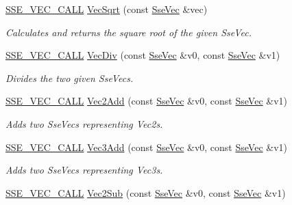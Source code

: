 \begin{DoxyCompactItemize}
\hyperlink{ssevec__math__defs_8h_a97454f977a5281455cecacce1e8ba670}{S\+S\+E\+\_\+\+V\+E\+C\+\_\+\+C\+A\+L\+L} \hyperlink{group___s_i_m_d_vec_math_ga5a870dbad6fdb8496b2e95104cc15f12}{Vec\+Sqrt} (const \hyperlink{namespacegofxmath_a634570ddcd2496053ee966227080e02f}{Sse\+Vec} \&vec)
\begin{DoxyCompactList}\small\item\em Calculates and returns the square root of the given Sse\+Vec. \end{DoxyCompactList}\item 
\hyperlink{ssevec__math__defs_8h_a97454f977a5281455cecacce1e8ba670}{S\+S\+E\+\_\+\+V\+E\+C\+\_\+\+C\+A\+L\+L} \hyperlink{group___s_i_m_d_vec_math_ga1aa6bb34526133e71f288a8e1e100fb1}{Vec\+Div} (const \hyperlink{namespacegofxmath_a634570ddcd2496053ee966227080e02f}{Sse\+Vec} \&v0, const \hyperlink{namespacegofxmath_a634570ddcd2496053ee966227080e02f}{Sse\+Vec} \&v1)
\begin{DoxyCompactList}\small\item\em Divides the two given Sse\+Vecs. \end{DoxyCompactList}\item 
\hyperlink{ssevec__math__defs_8h_a97454f977a5281455cecacce1e8ba670}{S\+S\+E\+\_\+\+V\+E\+C\+\_\+\+C\+A\+L\+L} \hyperlink{group___s_i_m_d_vec_math_gad1bc5d9e13ba5c54e2bf457ef9c0a30b}{Vec2\+Add} (const \hyperlink{namespacegofxmath_a634570ddcd2496053ee966227080e02f}{Sse\+Vec} \&v0, const \hyperlink{namespacegofxmath_a634570ddcd2496053ee966227080e02f}{Sse\+Vec} \&v1)
\begin{DoxyCompactList}\small\item\em Adds two Sse\+Vecs representing Vec2s. \end{DoxyCompactList}\item 
\hyperlink{ssevec__math__defs_8h_a97454f977a5281455cecacce1e8ba670}{S\+S\+E\+\_\+\+V\+E\+C\+\_\+\+C\+A\+L\+L} \hyperlink{group___s_i_m_d_vec_math_ga8a939dc9ef27240f00b4e0062afa4f92}{Vec3\+Add} (const \hyperlink{namespacegofxmath_a634570ddcd2496053ee966227080e02f}{Sse\+Vec} \&v0, const \hyperlink{namespacegofxmath_a634570ddcd2496053ee966227080e02f}{Sse\+Vec} \&v1)
\begin{DoxyCompactList}\small\item\em Adds two Sse\+Vecs representing Vec3s. \end{DoxyCompactList}\item 
\hyperlink{ssevec__math__defs_8h_a97454f977a5281455cecacce1e8ba670}{S\+S\+E\+\_\+\+V\+E\+C\+\_\+\+C\+A\+L\+L} \hyperlink{group___s_i_m_d_vec_math_ga0be0d77c16ddfb98fe517eb0dfa36545}{Vec2\+Sub} (const \hyperlink{namespacegofxmath_a634570ddcd2496053ee966227080e02f}{Sse\+Vec} \&v0, const \hyperlink{namespacegofxmath_a634570ddcd2496053ee966227080e02f}{Sse\+Vec} \&v1)

\end{DoxyCompactItemize}
